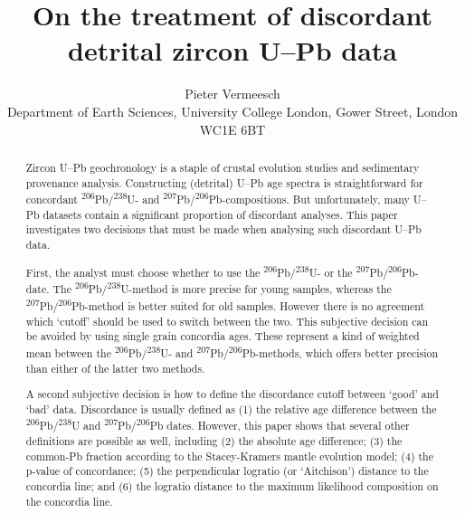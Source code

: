 \documentclass{article}
\title{On the treatment of discordant detrital zircon U--Pb data}
\author{Pieter Vermeesch\\ Department of Earth Sciences, University
  College London, Gower Street, London WC1E 6BT}
\begin{document}
\maketitle

\begin{abstract}
  Zircon U--Pb geochronology is a staple of crustal evolution studies
  and sedimentary provenance analysis. Constructing (detrital) U--Pb
  age spectra is straightforward for concordant
  \textsuperscript{206}Pb/\textsuperscript{238}U- and
  \textsuperscript{207}Pb/\textsuperscript{206}Pb-compositions.  But
  unfortunately, many U--Pb datasets contain a significant proportion
  of discordant analyses. This paper investigates two decisions that
  must be made when analysing such discordant U--Pb data.

  First, the analyst must choose whether to use the
  \textsuperscript{206}Pb/\textsuperscript{238}U- or the
  \textsuperscript{207}Pb/\textsuperscript{206}Pb-date. The
  \textsuperscript{206}Pb/\textsuperscript{238}U-method is more
  precise for young samples, whereas the
  \textsuperscript{207}Pb/\textsuperscript{206}Pb-method is better
  suited for old samples. However there is no agreement which `cutoff'
  should be used to switch between the two. This subjective decision
  can be avoided by using single grain concordia ages. These represent
  a kind of weighted mean between the
  \textsuperscript{206}Pb/\textsuperscript{238}U- and
  \textsuperscript{207}Pb/\textsuperscript{206}Pb-methods, which
  offers better precision than either of the latter two methods.

  A second subjective decision is how to define the discordance cutoff
  between `good' and `bad' data. Discordance is usually defined as (1)
  the relative age difference between the
  \textsuperscript{206}Pb/\textsuperscript{238}U and
  \textsuperscript{207}Pb/\textsuperscript{206}Pb dates.  However,
  this paper shows that several other definitions are possible as
  well, including (2) the absolute age difference; (3) the common-Pb
  fraction according to the Stacey-Kramers mantle evolution model; (4)
  the p-value of concordance; (5) the perpendicular logratio (or
  `Aitchison') distance to the concordia line; and (6) the logratio
  distance to the maximum likelihood composition on the concordia
  line.


\end{abstract}
\end{document}
